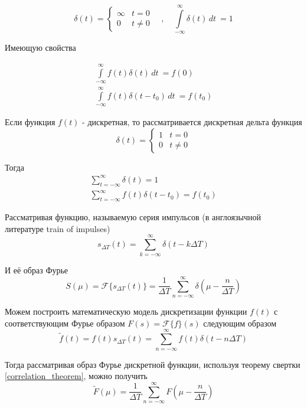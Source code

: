 \documentclass[oneside,final,14pt]{extreport}
\begin{document}
\begin{equation*}
\delta(t)=
\begin{cases}
\infty & t = 0 \\
0	 & t \neq 0
\end{cases}
\quad , \quad
{\int\limits_{-\infty}^{\infty}\delta(t)\,dt~}
=
1
\end{equation*}

Имеющую свойства

\begin{gather*}
{\int\limits_{-\infty}^{\infty}f(t)\delta(t)\,dt~}
=
f(0)
\\
{\int\limits_{-\infty}^{\infty}f(t)\delta(t-t_{0})\,dt~}
=
f(t_{0})
\end{gather*}

Если функция $f(t)$ - дискретная, то рассматривается дискретная дельта функция 
\begin{equation}
\delta(t)=
\begin{cases}
1 & t = 0 \\
0	 & t \neq 0
\end{cases}
\end{equation}

Тогда
\begin{gather}
\sum_{t = - \infty}^{\infty} \delta(t) 
=
1
\\
\sum_{t = - \infty}^{\infty} f(t) 
\delta(t - t_{0}) 
=
f(t_{0})
\end{gather} 

Рассматривая функцию, называемую серия импульсов (в англоязычной литературе train of impulses)
\begin{equation}
s_{\varDelta T}(t) 
=
\sum_{k=-\infty}^{\infty}
\delta(t - k\varDelta T)
\end{equation}

И её образ Фурье 
\begin{equation}
S(\mu) = \mathcal{F}
\{ s_{\varDelta T}(t)  \}
=
\frac{1}{\varDelta T}
\sum_{n = - \infty}^{\infty}
\delta(
\mu - \frac{n}{\varDelta T}
)
\end{equation}

Можем построить математическую модель дискретизации
функции $f(t)$ с соответствующим Фурье образом $F(s) = \mathcal{F}\{f\}(s)$  следующим образом
\begin{equation}
\tilde{f}(t) = 
f(t)s_{\varDelta T}(t)
=
\sum_{n = -\infty}^{\infty}
f(t)
\delta(t - n\varDelta T)
\end{equation}

Тогда рассматривая образ Фурье дискретной функции, используя теорему свертки \ref{correlation_theorem},  можно получить \cite{Gonzalez}
\begin{equation}
\tilde{F}(\mu) = 
\frac{1}{\varDelta T}
\sum_{n = - \infty}^{\infty}
F(
\mu - \frac{n}{\varDelta T}
)
\label{Furier_sampling_result}
\end{equation}
\end{document}
